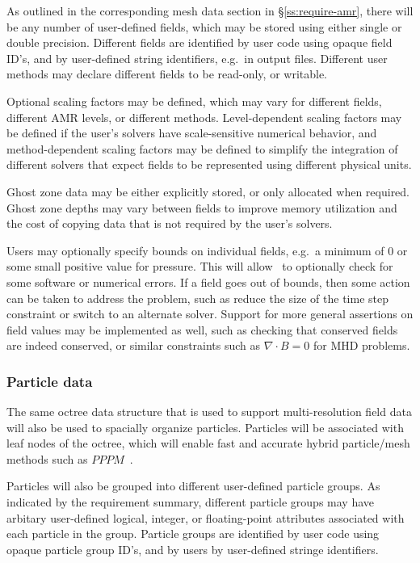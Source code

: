 \documentclass[10pt,twocolumn]{article}
\begin{document}
As outlined in the corresponding mesh data section in
\S\ref{ss:require-amr}, there will be any number of user-defined
fields, which may be stored using either single or double precision.
Different fields are identified by user code using opaque field ID's,
and by user-defined string identifiers, e.g.~in output files.
Different user methods may declare different fields to be read-only,
or writable.

Optional scaling factors may be defined, which may vary for different
fields, different AMR levels, or different methods.  Level-dependent
scaling factors may be defined if the user's solvers have
scale-sensitive numerical behavior, and method-dependent scaling
factors may be defined to simplify the integration of different
solvers that expect fields to be represented using different physical
units.

Ghost zone data may be either explicitly stored, or only allocated
when required.  Ghost zone depths may vary between fields to improve
memory utilization and the cost of copying data that is not required
by the user's solvers.  

Users may optionally specify bounds on individual fields, e.g.~a
minimum of $0$ or some small positive value for pressure.  This will
allow \cello\ to optionally check for some software or numerical
errors.  If a field goes out of bounds, then some action can be taken
to address the problem, such as reduce the size of the time step
constraint or switch to an alternate solver.  Support for more general
assertions on field values may be implemented as well, such as
checking that conserved fields are indeed conserved, or similar
constraints such as $\nabla\cdot B=0$ for MHD problems.

\subsubsection{Particle data} \label{sss:design-particles}

The same octree data structure that is used to support
multi-resolution field data will also be used to spacially organize
particles.  Particles will be associated with leaf nodes of the
octree, which will enable fast and accurate hybrid particle/mesh
methods such as $PPPM$~\cite{HoEa88}.

Particles will also be grouped into different user-defined particle
groups.  As indicated by the requirement summary, different particle
groups may have arbitary user-defined logical, integer, or
floating-point attributes associated with each particle in the group.
Particle groups are identified by user code using opaque particle
group ID's, and by users by user-defined stringe identifiers.
\end{document}
